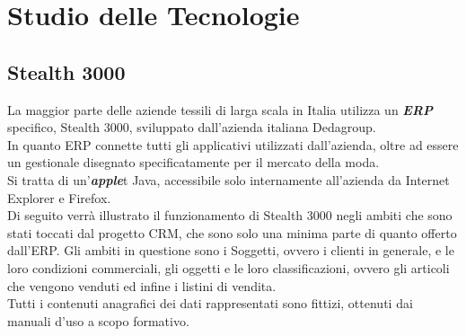 \section{Studio delle Tecnologie}
\subsection{Stealth 3000}
La maggior parte delle aziende tessili di larga scala in Italia utilizza un \textit{\textbf{ERP}} specifico, Stealth 3000, sviluppato dall'azienda italiana Dedagroup.\\
In quanto ERP connette tutti gli applicativi utilizzati dall'azienda, oltre ad essere un gestionale disegnato specificatamente per il mercato della moda. \\
Si tratta di un'\textit{\textbf{apple}}t Java, accessibile solo internamente all'azienda da Internet Explorer e Firefox.\\
Di seguito verrà illustrato il funzionamento di Stealth 3000 negli ambiti che sono stati toccati dal progetto CRM, che sono solo una minima parte di quanto offerto dall'ERP. Gli ambiti in questione sono i Soggetti, ovvero i clienti in generale, e le loro condizioni commerciali, gli oggetti e le loro classificazioni, ovvero gli articoli che vengono venduti ed infine i listini di vendita.\\
Tutti i contenuti anagrafici dei dati rappresentati sono fittizi, ottenuti dai manuali d'uso a scopo formativo.

